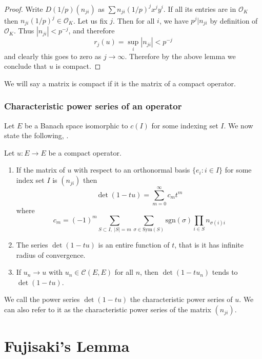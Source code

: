 \begin{proof}
    Write $D(1/p)(n_{ji})$ as $\sum n_{ji} (1/p)^j x^jy^i$. If all its entries are in $\mathcal{O}_K$ then $n_{ji} (1/p)^j \in \mathcal{O}_K$. Let us fix $j$. Then for all $i$, we have $p^j | n_{ji}$ by definition of $\mathcal{O}_K$. Thus $|n_{ji}| < p^{-j}$, and therefore
    \[
    r_j (u) = \sup_{i} |n_{ji}| < p^{-j}
    \]
    and clearly this goes to zero as $j \to \infty$. Therefore by the above lemma we conclude that $u$ is compact.
\end{proof}

We will say a matrix is compact if it is the matrix of a compact operator.

\subsection{Characteristic power series of an operator}

Let $E$ be a Banach space isomorphic to $c(I)$ for some indexing set $I$.
We now state the following, \cite[Proposition~7]{Serre}.

\begin{proposition}
    Let $u : E \to E$ be a compact operator.
    \begin{enumerate}
        \item If the matrix of $u$ with respect to an orthonormal basis $\{e_i : i \in I \}$ for some index set $I$ is $(n_{ji})$ then
        \[
        \det (1 - t u) = \sum_{m = 0}^{\infty} c_m t^m
        \]
        where
        \[
        c_m = (-1)^m \sum_{ S \subset I, \; |S| = m} \sum_{\sigma \in \text{Sym}(S)} \text{sgn}(\sigma) \prod_{i \in S} n_{\sigma(i)i}
        \]
        \item The series $\det(1-tu)$ is an entire function of $t$, that is it has infinite radius of convergence.
        \item If $u_n \to u$ with $u_n \in \mathcal{C}(E,E)$ for all $n$, then $\det (1 - tu_n)$ tends to $\det(1-tu)$.
    \end{enumerate}
\end{proposition}

\begin{definition}
    We call the power series $\det(1 - tu)$ the characteristic power series of $u$. We can also refer to it as the characteristic power series of the matrix $(n_{ji}).$
\end{definition}


\chapter{Fujisaki's Lemma}


